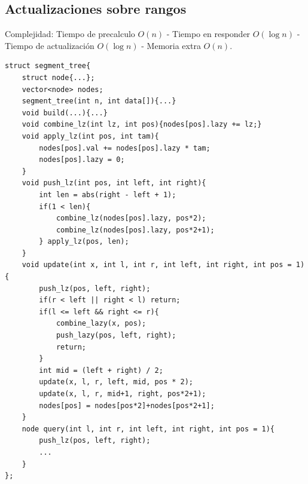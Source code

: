 \documentclass[10pt,spanish,mexico]{article}
\numberwithin{equation}{section}
\begin{document}
\begin{multicols}{2}
\vspace{-1.2\baselineskip}
\hrulefill
\subsection{Actualizaciones sobre rangos}
Complejidad: Tiempo de precalculo $O(n)$ - Tiempo en responder $O(\log n)$ - Tiempo de actualización $O(\log n)$ - Memoria extra $O(n)$.
\begin{verbatim}
struct segment_tree{
    struct node{...};
    vector<node> nodes;
    segment_tree(int n, int data[]){...}
    void build(...){...}
    void combine_lz(int lz, int pos){nodes[pos].lazy += lz;}
    void apply_lz(int pos, int tam){
        nodes[pos].val += nodes[pos].lazy * tam;
        nodes[pos].lazy = 0;
    }
    void push_lz(int pos, int left, int right){
        int len = abs(right - left + 1);
        if(1 < len){
            combine_lz(nodes[pos].lazy, pos*2);
            combine_lz(nodes[pos].lazy, pos*2+1);
        } apply_lz(pos, len);
    }
    void update(int x, int l, int r, int left, int right, int pos = 1){
        push_lz(pos, left, right);
        if(r < left || right < l) return;
        if(l <= left && right <= r){
            combine_lazy(x, pos);
            push_lazy(pos, left, right);
            return;
        }
        int mid = (left + right) / 2;
        update(x, l, r, left, mid, pos * 2);
        update(x, l, r, mid+1, right, pos*2+1);
        nodes[pos] = nodes[pos*2]+nodes[pos*2+1];
    }
    node query(int l, int r, int left, int right, int pos = 1){
        push_lz(pos, left, right);
        ...
    }
};
\end{verbatim}

\vspace{-1.2\baselineskip}
\hrulefill

\end{multicols}
\end{document}
